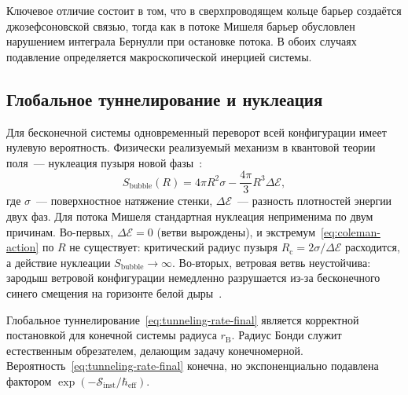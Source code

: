 \documentclass[12pt,a4paper,preprint]{elsarticle}
\begin{document}
            Ключевое отличие состоит в том, что в сверхпроводящем кольце барьер создаётся джозефсоновской связью, тогда как в потоке Мишеля барьер обусловлен нарушением интеграла Бернулли при остановке потока. В обоих случаях подавление определяется макроскопической инерцией системы.

        \subsection{Глобальное туннелирование и нуклеация}\label{subsec:nucleation}
            Для бесконечной системы одновременный переворот всей конфигурации имеет нулевую вероятность. Физически реализуемый механизм в квантовой теории поля~--- нуклеация пузыря новой фазы~\cite{ColemanS_AspectsOfSymmetry_1985}:
            \begin{equation}
                S_{\mathrm{bubble}}(R) = 4\pi R^{2}\sigma - \frac{4\pi}{3}R^{3}\Delta\mathcal{E},
                \label{eq:coleman-action}
            \end{equation}
            где $\sigma$~--- поверхностное натяжение стенки, $\Delta\mathcal{E}$~--- разность плотностей энергии двух фаз. Для потока Мишеля стандартная нуклеация неприменима по двум причинам. Во-первых, $\Delta\mathcal{E} = 0$ (ветви вырождены), и экстремум~\eqref{eq:coleman-action} по $R$ не существует: критический радиус пузыря $R_{\mathrm{c}} = 2\sigma/\Delta\mathcal{E}$ расходится, а действие нуклеации $S_{\mathrm{bubble}} \to \infty$. Во-вторых, ветровая ветвь неустойчива: зародыш ветровой конфигурации немедленно разрушается из-за бесконечного синего смещения на горизонте белой дыры~\cite{SemyannikovAV_GlobalAcousticGeometryOfMichelFlowInPainleveGullstrandCoordinates_2026}.
            
            Глобальное туннелирование~\eqref{eq:tunneling-rate-final} является корректной постановкой для конечной системы радиуса $r_{\mathrm{B}}$. Радиус Бонди служит естественным обрезателем, делающим задачу конечномерной. Вероятность~\eqref{eq:tunneling-rate-final} конечна, но экспоненциально подавлена фактором $\exp(-\mathcal{S}_{\mathrm{inst}}/\hbar_{\mathrm{eff}})$.
\end{document}
